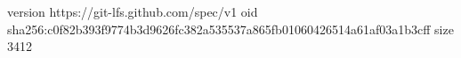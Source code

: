 version https://git-lfs.github.com/spec/v1
oid sha256:c0f82b393f9774b3d9626fc382a535537a865fb01060426514a61af03a1b3cff
size 3412
